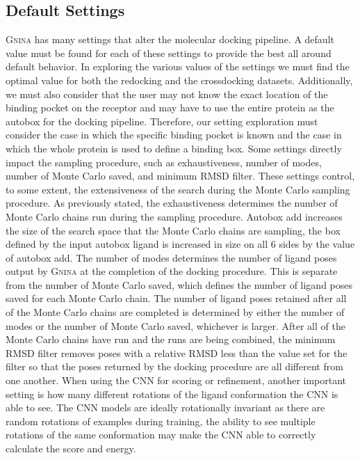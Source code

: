 \documentclass[journal=jcisd8,manuscript=article]{achemso}
\begin{document}
\subsection{Default Settings}
\textsc{Gnina} has many settings that alter the molecular docking pipeline. A default value must be found for each of these settings to provide the best all around default behavior. In exploring the various values of the settings we must find the optimal value for both the redocking and the crossdocking datasets. Additionally, we must also consider that the user may not know the exact location of the binding pocket on the receptor and may have to use the entire protein as the autobox for the docking pipeline. Therefore, our setting exploration must consider the case in which the specific binding pocket is known and the case in which the whole protein is used to define a binding box. Some settings directly impact the sampling procedure, such as exhaustiveness, number of modes, number of Monte Carlo saved, and minimum RMSD filter. These settings control, to some extent, the extensiveness of the search during the Monte Carlo sampling procedure. As previously stated, the exhaustiveness determines the number of Monte Carlo chains run during the sampling procedure. Autobox add increases the size of the search space that the Monte Carlo chains are sampling, the box defined by the input autobox ligand is increased in size on all 6 sides by the value of autobox add. The number of modes determines the number of ligand poses output by \textsc{Gnina} at the completion of the docking procedure. This is separate from the number of Monte Carlo saved, which defines the number of  ligand poses saved for each Monte Carlo chain. The number of ligand poses retained after all of the Monte Carlo chains are completed is determined by either the number of modes or the number of Monte Carlo saved, whichever is larger. After all of the Monte Carlo chains have run and the runs are being combined, the minimum RMSD filter removes poses with a relative RMSD less than the value set for the filter so that the poses returned by the docking procedure are all different from one another. When using the CNN for scoring or refinement, another important setting is how many different rotations of the ligand conformation the CNN is able to see. The CNN models are ideally rotationally invariant as there are random rotations of examples during training, the ability to see multiple rotations of the same conformation may make the CNN able to correctly calculate the score and energy.
\end{document}
